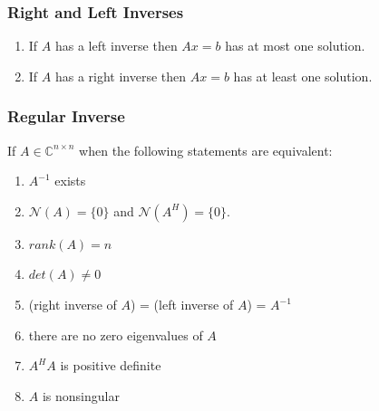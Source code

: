\documentclass{beamer}
\begin{document}
\begin{frame}\frametitle{Right and Left Inverses}
	\begin{lemma}
		\begin{enumerate}
		\item If $A$ has a left inverse then $Ax = b$ has at most one solution.
		\item If $A$ has a right inverse then $Ax = b$ has at least one solution.
		\end{enumerate}
	\end{lemma}
\end{frame}

\begin{frame}\frametitle{Regular Inverse}
	If $A \in \mathbb{C}^{n \times n}$ when the following statements are equivalent:
	\begin{enumerate}
  		\item $A^{-1}$ exists
  		\item $\mathcal{N}(A) = \{0\}$ and $\mathcal{N}(A^H)=\{0\}$.
  		\item $rank(A) = n$
  		\item $det(A) \neq 0$
  		\item (right inverse of $A$) = (left inverse of $A$) = $A^{-1}$
  		\item there are no zero eigenvalues of $A$
  		\item $A^HA$ is positive definite
  		\item $A$ is nonsingular
		\end{enumerate}
\end{frame}
\end{document}
